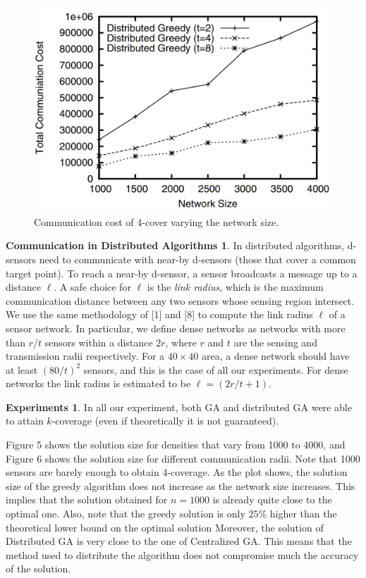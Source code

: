 \documentclass[conference]{IEEEtran}
\theoremstyle{definition}
\newtheorem*{Communication_in_Distributed_Algorithms}{Communication in Distributed Algorithms}
\newtheorem*{experiments}{Experiments}
\newtheorem*{NP-Hardness of Approximating the SODkC Problem}{NP-Hardness of Approximating the SODkC Problem}
\newtheorem*{Greedy Algorithm (GA)}{Greedy Algorithm (GA)}
\newtheorem*{GA on the Running Example}{GA on the Running Example}
\newtheorem*{Performance Guarantee of GA}{Performance Guarantee of GA}
\begin{document}
\begin{figure}[t]
    \centering
    \includegraphics[width=0.7\columnwidth]{7.png}
    \caption{Communication cost of 4-cover varying the network size.}
    \label{fig:enter-label}
\end{figure}
\begin{Communication_in_Distributed_Algorithms}
In distributed algorithms, d-sensors need to communicate with near-by d-sensors (those that cover a common target point). To reach a near-by d-sensor, a sensor broadcasts a message up to a distance $\ell$. A safe choice for $\ell$ is the \textit{link radius}, which is the maximum communication distance between any two sensors whose sensing region  intersect. We use the same methodology of [1] and [8] to compute the link radius $\ell$ of a sensor network. In particular, we define dense networks as networks with more than $r/t$ sensors within a distance $2r$, where $r$ and $t$ are the sensing and transmission radii respectively. For a $40 \times 40$ area, a dense network should have at least $(80/t)^2$ sensors, and this is the case of all our experiments. For dense networks the link radius is estimated to be $ \ell = (2r/t + 1)$.
\end{Communication_in_Distributed_Algorithms}

\begin{experiments}
In all our experiment, both GA and distributed GA were able to attain $k$-coverage (even if theoretically it is not guaranteed).
\end{experiments}

Figure 5 shows the solution size for densities that vary from 1000 to 4000, and Figure 6 shows the solution size for different communication radii. Note that 1000 sensors are barely enough to obtain 4-coverage. As the plot shows, the solution size of the greedy algorithm does not increase as the network size increases. This implies that the solution obtained for $n = 1000$ is already quite close to the optimal one. Also, note that the greedy solution is only $25\%$ higher than the theoretical lower bound on the optimal solution Moreover, the solution of Distributed GA is very close to the one of Centralized GA. This means that the method used to distribute the algorithm does not compromise much the accuracy of the solution.
\end{document}
